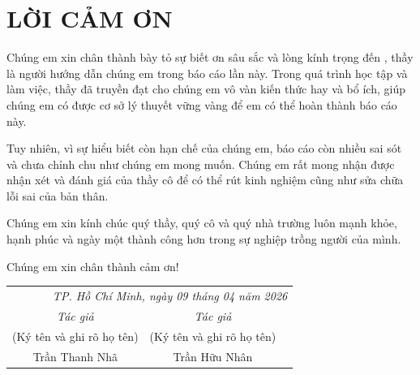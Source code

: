 \section*{LỜI CẢM ƠN}
	Chúng em xin chân thành bày tỏ sự biết ơn sâu sắc và lòng kính trọng đến \gvhd \mbox{}, thầy là người hướng dẫn chúng em trong báo cáo lần này. Trong quá trình học tập và làm việc, thầy đã truyền đạt cho chúng em vô vàn kiến thức hay và bổ ích, giúp chúng em có được cơ sở lý thuyết vững vàng để em có thể hoàn thành báo cáo này.

	Tuy nhiên, vì sự hiểu biết còn hạn chế của chúng em, báo cáo còn nhiều sai sót và chưa chỉnh chu như chúng em mong muốn. Chúng em rất mong nhận được nhận xét và đánh giá của thầy cô để có thể rút kinh nghiệm cũng như sửa chữa lỗi sai của bản thân.

    Chúng em xin kính chúc quý thầy, quý cô và quý nhà trường luôn mạnh khỏe, hạnh phúc và ngày một thành công hơn trong sự nghiệp trồng người của mình. 
    
    Chúng em xin chân thành cảm ơn!\\

\begin{flushright}
\begin{tabular}{ccc}
    \multicolumn{3}{r}{\textit{TP. Hồ Chí Minh, ngày 09 tháng 04 năm 2026}} \\
    \noalign{\vspace{0.5cm}} %
    \textit{Tác giả} & \textit{Tác giả} \\
    (Ký tên và ghi rõ họ tên) & (Ký tên và ghi rõ họ tên) \\
    \noalign{\vspace{2cm}}
    Trần Thanh Nhã & Trần Hữu Nhân \\
\end{tabular}
\end{flushright}

\newpage

